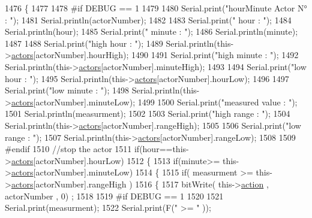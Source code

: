 \begin{DoxyCode}
1476 \{
1477 
1478 \textcolor{preprocessor}{#if DEBUG == 1}
1479     
1480     Serial.print(\textcolor{stringliteral}{"hourMinute Actor N° : "});
1481     Serial.println(actorNumber);
1482 
1483     Serial.print(\textcolor{stringliteral}{" hour : "});
1484     Serial.println(hour);
1485     Serial.print(\textcolor{stringliteral}{" minute : "});
1486     Serial.println(minute);
1487 
1488     Serial.print(\textcolor{stringliteral}{"high hour : "});
1489     Serial.println(this->\hyperlink{class_jetpack_a7e16d2f97837f9712a2e6de1c50d99db}{actors}[actorNumber].hourHigh);
1490 
1491     Serial.print(\textcolor{stringliteral}{"high minute : "});
1492     Serial.println(this->\hyperlink{class_jetpack_a7e16d2f97837f9712a2e6de1c50d99db}{actors}[actorNumber].minuteHigh);
1493 
1494     Serial.print(\textcolor{stringliteral}{"low hour : "});
1495     Serial.println(this->\hyperlink{class_jetpack_a7e16d2f97837f9712a2e6de1c50d99db}{actors}[actorNumber].hourLow);
1496 
1497     Serial.print(\textcolor{stringliteral}{"low minute : "});
1498     Serial.println(this->\hyperlink{class_jetpack_a7e16d2f97837f9712a2e6de1c50d99db}{actors}[actorNumber].minuteLow);
1499 
1500     Serial.print(\textcolor{stringliteral}{"measured value : "});
1501     Serial.println(measurment);
1502 
1503     Serial.print(\textcolor{stringliteral}{"high range : "});
1504     Serial.println(this->\hyperlink{class_jetpack_a7e16d2f97837f9712a2e6de1c50d99db}{actors}[actorNumber].rangeHigh);
1505 
1506     Serial.print(\textcolor{stringliteral}{"low range : "});
1507     Serial.println(this->\hyperlink{class_jetpack_a7e16d2f97837f9712a2e6de1c50d99db}{actors}[actorNumber].rangeLow);
1508 
1509 \textcolor{preprocessor}{#endif}
1510     \textcolor{comment}{//stop the actor}
1511     \textcolor{keywordflow}{if}(hour==this->\hyperlink{class_jetpack_a7e16d2f97837f9712a2e6de1c50d99db}{actors}[actorNumber].hourLow)
1512     \{
1513         \textcolor{keywordflow}{if}(minute>= this->\hyperlink{class_jetpack_a7e16d2f97837f9712a2e6de1c50d99db}{actors}[actorNumber].minuteLow)
1514         \{
1515             \textcolor{keywordflow}{if}( measurment >= this->\hyperlink{class_jetpack_a7e16d2f97837f9712a2e6de1c50d99db}{actors}[actorNumber].rangeHigh )
1516             \{
1517                 bitWrite( this->\hyperlink{class_jetpack_aca3142925a7b0834b34ae91d26af7765}{action} , actorNumber , 0) ;
1518 
1519 \textcolor{preprocessor}{            #if DEBUG == 1 }
1520 
1521                 Serial.print(measurment);
1522                 Serial.print(F(\textcolor{stringliteral}{" >= "} ));

\end{DoxyCode}
